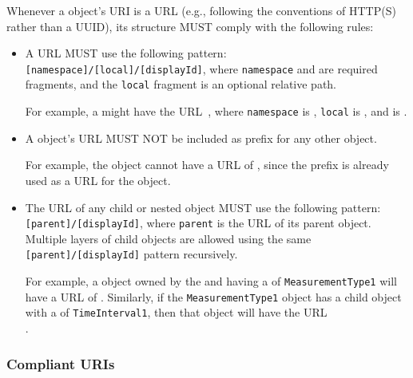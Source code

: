 Whenever a  object's URI is a URL (e.g., following the conventions of HTTP(S) rather than a UUID), its structure MUST comply with the following rules:

\begin{itemize}

 \item A  URL MUST use the following pattern:
  \texttt{[namespace]/[local]/[displayId]},  where \texttt{namespace} and  are required fragments, and the \texttt{local} fragment is an optional relative path.
  
  	For example, a  might have the URL~, where \texttt{namespace} is , \texttt{local} is , and  is .

  \item A  object's URL MUST NOT be included as prefix for any other  object.
  
  	For example, the   object cannot have a URL of , since the  prefix is already used as a URL for the   object.

  \item The URL of any child or nested object MUST use the following pattern:\texttt{[parent]/[displayId]}, where \texttt{parent} is the URL of its parent object.
	Multiple layers of child objects are allowed using the same\\ \texttt{[parent]/[displayId]} pattern recursively.
	
	For example, a  object owned by the   and having a  of \texttt{MeasurementType1} will have a URL of .
	Similarly, if the \texttt{MeasurementType1} object has a  child object with a  of \texttt{TimeInterval1}, then that object will have the URL\\ .
  \end{itemize}

\subsubsection{Compliant URIs}
\label{sec:compliant}

